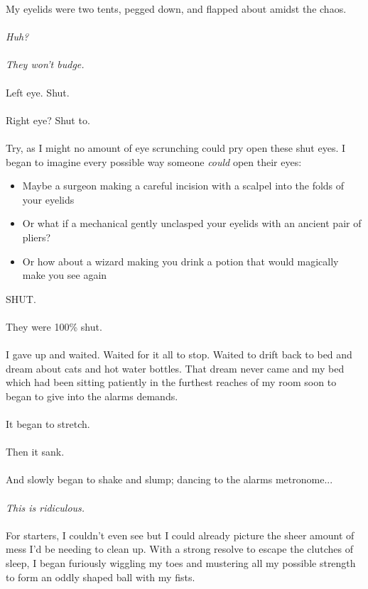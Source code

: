 \documentclass{book}
\begin{document}
{{	My eyelids were two tents, pegged down, and flapped about amidst the chaos.
	\\\\
	\textit{Huh?}
	\\\\
	\textit{They won't budge.}
	\\\\
	Left eye.
	Shut.\\\\
	Right eye?
	Shut to.\\\\
	\newpage
	Try, as I might no amount of eye scrunching could pry
	open these shut eyes.
	I began to imagine every possible way someone \textit{could} open their eyes:
	\begin{itemize}
		\item Maybe a surgeon making a careful incision with a scalpel into the folds of your eyelids
		\item Or what if a mechanical gently unclasped your eyelids with an ancient pair of pliers?
		\item Or how about  a wizard making you drink a potion that would magically make you see again
	\end{itemize}
	SHUT.\\\\
	They were 100\% shut.\\\\
	I gave up and waited. Waited for it all to stop. Waited to
	drift back to bed and dream about cats and hot water bottles.
	That dream never came and my bed which had been sitting patiently
	in the furthest reaches of my room soon to began to give
	into the alarms demands.\\\\
	It began to stretch.\\\\
	Then it sank.\\\\
	And slowly began to shake and slump; dancing to the alarms metronome...\\\\
	\textit{This is ridiculous.}\\\\
	For starters, I couldn't even see but I could already picture
	the sheer amount of mess I'd be needing to clean up.
	With a strong resolve to escape the clutches of sleep, I began
	furiously wiggling my toes and mustering all my possible strength
	to form an oddly shaped ball with my fists.\\\\
}}
\end{document}
